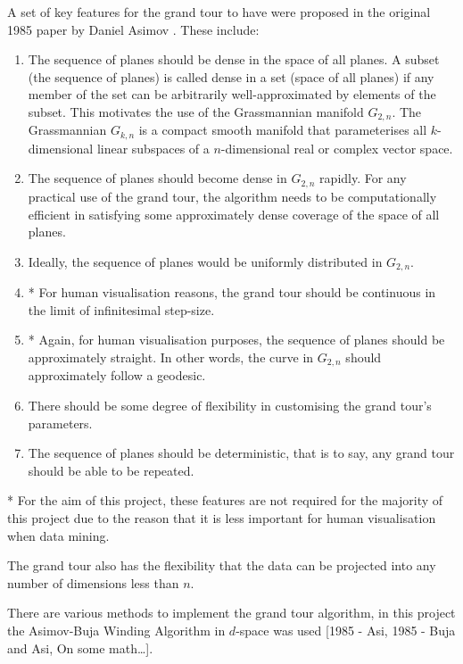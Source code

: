 \documentclass[a4paper,11pt,twoside]{article}
\begin{document}
A set of key features for the grand tour to have were proposed in the original 1985 paper by Daniel Asimov \cite{Asimov1985}. These include:
\begin{enumerate}
\item The sequence of planes should be dense in the space of all planes. A subset (the sequence of planes) is called dense in a set (space of all planes) if any member of the set can be arbitrarily well-approximated by elements of the subset. This motivates the use of the Grassmannian manifold $G_{2,n}$. The Grassmannian $G_{k,n}$ is a compact smooth manifold that parameterises all $k$-dimensional linear subspaces of a $n$-dimensional real or complex vector space.
\item The sequence of planes should become dense in $G_{2,n}$ rapidly. For any practical use of the grand tour, the algorithm needs to be computationally efficient in satisfying some approximately dense coverage of the space of all planes.
\item Ideally, the sequence of planes would be uniformly distributed in $G_{2,n}$.
\item* For human visualisation reasons, the grand tour should be continuous in the limit of infinitesimal step-size.
\item* Again, for human visualisation purposes, the sequence of planes should be approximately straight. In other words, the curve in $G_{2,n}$ should approximately follow a geodesic.
\item There should be some degree of flexibility in customising the grand tour's parameters.
\item The sequence of planes should be deterministic, that is to say, any grand tour should be able to be repeated.
\end{enumerate}

* For the aim of this project, these features are not required for the majority of this project due to the reason that it is less important for human visualisation when data mining.
\newline

The grand tour also has the flexibility that the data can be projected into any number of dimensions less than $n$.
\newline

There are various methods to implement the grand tour algorithm, in this project the Asimov-Buja Winding Algorithm in $d$-space was used \cite{Asimov1985}[1985 - Asi, 1985 - Buja and Asi, On some math…]. 
\end{document}
